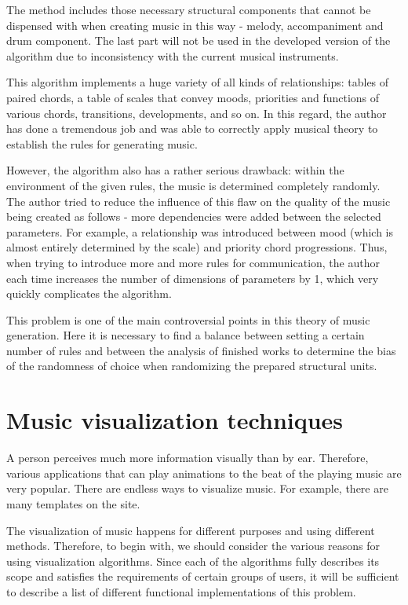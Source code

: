 \documentclass[thesis=B,english]{FITthesis}[2019/12/23]
\begin{document}
The method includes those necessary structural components that cannot be dispensed with when creating music in this way - melody, accompaniment and drum component. The last part will not be used in the developed version of the algorithm due to inconsistency with the current musical instruments.

This algorithm implements a huge variety of all kinds of relationships: tables of paired chords, a table of scales that convey moods, priorities and functions of various chords, transitions, developments, and so on. In this regard, the author has done a tremendous job and was able to correctly apply musical theory to establish the rules for generating music.

However, the algorithm also has a rather serious drawback: within the environment of the given rules, the music is determined completely randomly. The author tried to reduce the influence of this flaw on the quality of the music being created as follows - more dependencies were added between the selected parameters. For example, a relationship was introduced between mood (which is almost entirely determined by the scale) and priority chord progressions. Thus, when trying to introduce more and more rules for communication, the author each time increases the number of dimensions of parameters by 1, which very quickly complicates the algorithm.

This problem is one of the main controversial points in this theory of music generation. Here it is necessary to find a balance between setting a certain number of rules and between the analysis of finished works to determine the bias of the randomness of choice when randomizing the prepared structural units.

\section{Music visualization techniques}

A person perceives much more information visually than by ear. Therefore, various applications that can play animations to the beat of the playing music are very popular. There are endless ways to visualize music. For example, there are many templates on the \cite{music_vizualization_templates} site. 

The visualization of music happens for different purposes and using different methods. Therefore, to begin with, we should consider the various reasons for using visualization algorithms. Since each of the algorithms fully describes its scope and satisfies the requirements of certain groups of users, it will be sufficient to describe a list of different functional implementations of this problem.
\end{document}
